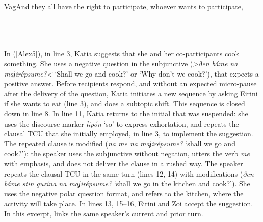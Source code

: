 \documentclass[output=paper]{LSP/langsci}
\begin{document}
\begin{Transcript}[FS {>}{>}]{Vag}{And they all have the right to participate, whoever wants to participate,}
\\                   
    \\                 
\\
\\    
\end{Transcript}

In (\ref{Alex5}), in line 3, Katia suggests that she and her co-participants cook something. She uses a negative question in the subjunctive (\textit{>ðen báme na maʝirépsume?<} `Shall we go and cook?' or `Why don’t we cook?'), that expects a positive answer. Before recipients respond, and without an expected micro-pause after the delivery of the question, Katia initiates a new sequence by asking Eirini if she wants to eat (line 3), and does a subtopic shift. This sequence is closed down in line 8. In line 11, Katia returns to the initial  that was suspended: she uses the discourse marker \textit{lipón} `so' to express exhortation, and repeats the clausal TCU that she initially employed, in line 3, to implement the suggestion. The repeated clause is modified (\textit{na \underline{}me na maʝirépsume?} `shall we go and cook?'): the speaker uses the subjunctive without negation, utters the verb \textit{\underline{}me} with emphasis, and does not deliver the clause in a rushed way. The speaker repeats the clausal TCU in the same turn (lines 12, 14) with modifications (\textit{ðen báme stin guzína na maʝirépsume?} `shall we go in the kitchen and cook?'). She uses the negative polar question format, and refers to the kitchen, where the activity will take place. In lines 13, 15--16, Eirini and Zoi accept the suggestion. In this excerpt,  links the same speaker’s current and prior turn. 
\end{document}
